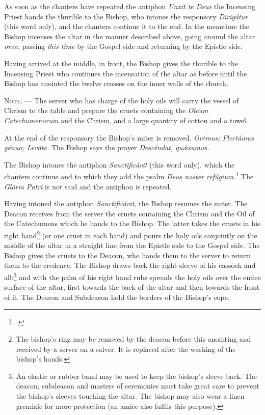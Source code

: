 \documentclass[letterpaper]{report}
\begin{document}
{    As soon as the chanters have repeated the antiphon \textit{Unxit te Deus}
    the Incensing Priest hands the thurible to the Bishop, who intones the
    responsory \textit{Dirig\'atur} (this word only), and the chanters continue
    it to the end. In the meantime the Bishop incenses the altar in the manner
    described above, going around the altar \textit{once}, passing \textit{this
    time} by the Gospel side and returning by the Epistle side.

    \rubric Having arrived at the middle, in front, the Bishop gives the
    thurible to the Incensing Priest who continues the incensation of the altar
    as before until the Bishop has anointed the twelve crosses on the inner
    walls of the church.

    \textsc{Note. ---} The server who has charge of the holy oils will carry
    the vessel of Chrism to the table and prepare the cruets containing the
    \textit{Oleum Catechumenorum} and the Chrism, and a large
    quantity of cotton and a towel.

    \rubric At the end of the responsory the Bishop's miter is removed.
    \textit{Orémus; Flectámus génua; Leváte.} The Bishop says the prayer
    \textit{Descéndat, qu\'\ae sumus.}

    \rubric The Bishop intones the antiphon \textit{Sanctificávit} (this word
    only), which the chanters continue and to which they add the psalm
    \textit{Deus noster refúgium.}\footcite[The antiphon \textit{Sanctificávit
    Dóminus} may be repeated after each verse of this psalm.][footnote 1, p.
    108.]{consecranda} The \textit{Glória Patri} is not said and the antiphon
    is repeated.

    \rubric Having intoned the antiphon \textit{Sanctificávit,} the Bishop
    resumes the miter. The Deacon receives from the server the cruets
    containing the Chrism and the Oil of the Catechumens which he hands to the
    Bishop. The latter takes the cruets in his right hand\footnote{The bishop's
    ring may be removed by the deacon before this anointing and received by a
    server on a salver. It is replaced after the washing of the bishop's
    hands.} (or one cruet in each hand) and pours the holy oils conjointly on
    the middle of the altar in a straight line from the Epistle side to the
    Gospel side. The Bishop gives the cruets to the Deacon, who hands them to
    the server to return them to the credence. The Bishop draws back the right
    sleeve of his cassock and alb\footnote{An elastic or rubber band may be
    used to keep the bishop's sleeve back. The deacon, subdeacon and masters of
    ceremonies must take great care to prevent the bishop's sleeves touching
    the altar. The bishop may also wear a linen gremiale for more protection
    (an amice also fulfils this purpose).} and with the palm of his right hand
    rubs spreads the holy oils over the entire surface of the altar, first
    towards the back of the altar and then towards the front of it. The Deacon
    and Subdeacon hold the borders of the Bishop's cope.

}
\end{document}
